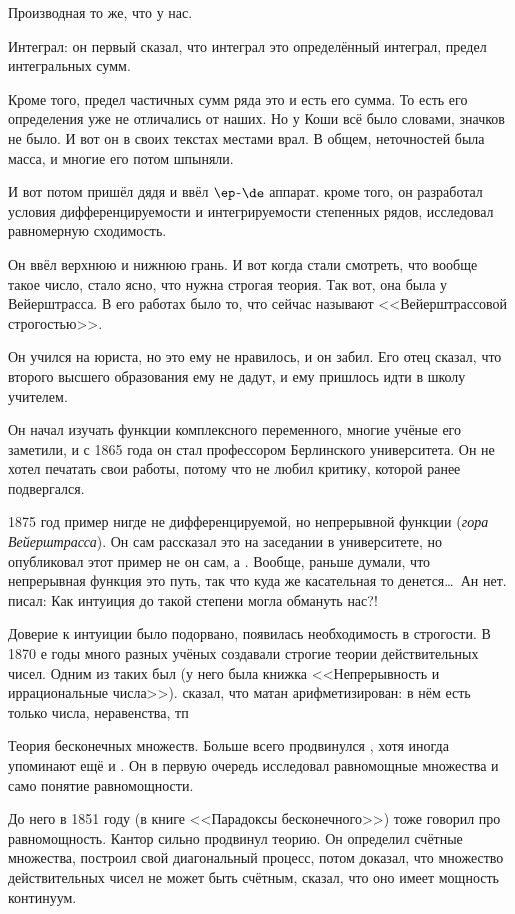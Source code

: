 \documentclass[a4paper,oneside,fleqn,10pt]{article}
\begin{document}
Производная то же, что у нас.

Интеграл: он первый сказал, что интеграл это определённый интеграл,
предел интегральных сумм.

Кроме того, предел частичных сумм ряда это и есть его сумма. То есть его
определения уже не отличались от наших. Но у Коши всё было словами, значков не было.
И вот он в своих текстах местами врал. В общем, неточностей была масса, и многие
его потом шпыняли.

И вот потом пришёл дядя   и ввёл $\ep$-$\de$ аппарат.
кроме того, он разработал условия дифференцируемости и интегрируемости степенных рядов,
исследовал равномерную сходимость.

Он ввёл верхнюю и нижнюю грань. И вот когда стали смотреть, что вообще такое число,
стало ясно, что нужна строгая теория. Так вот, она была у Вейерштрасса. В его работах было
то, что сейчас называют <<Вейерштрассовой строгостью>>.

Он учился на юриста, но это ему не нравилось, и он забил.
Его отец сказал, что второго высшего образования ему не дадут,
и ему пришлось идти в школу учителем.

Он начал изучать функции комплексного переменного, многие учёные его заметили,
и с 1865 года он стал профессором Берлинского университета. Он не хотел
печатать свои работы, потому что не любил критику, которой ранее подвергался.

1875 год пример нигде не дифференцируемой, но непрерывной функции (\emph{гора Вейерштрасса}).
Он сам рассказал это на заседании
в университете, но опубликовал этот пример не он сам, а .
Вообще, раньше думали, что непрерывная функция это путь, так что куда же
касательная то денется\ldots\ Ан нет.  писал: Как интуиция до такой степени могла обмануть нас?!

Доверие к интуиции было подорвано, появилась необходимость в строгости.
В 1870 е годы много разных учёных создавали строгие теории действительных чисел.
Одним из таких был  (у него была книжка <<Непрерывность и иррациональные числа>>).
 сказал, что матан арифметизирован: в нём есть только числа, неравенства, тп

Теория бесконечных множеств. Больше всего продвинулся , хотя иногда упоминают ещё
и . Он в первую очередь исследовал равномощные множества и само понятие равномощности.

До него в 1851 году  (в книге <<Парадоксы бесконечного>>) тоже говорил про равномощность.
Кантор сильно продвинул теорию. Он определил счётные множества,
построил свой диагональный процесс, потом доказал, что множество действительных чисел не может быть
счётным, сказал, что оно имеет мощность континуум.
\end{document}

